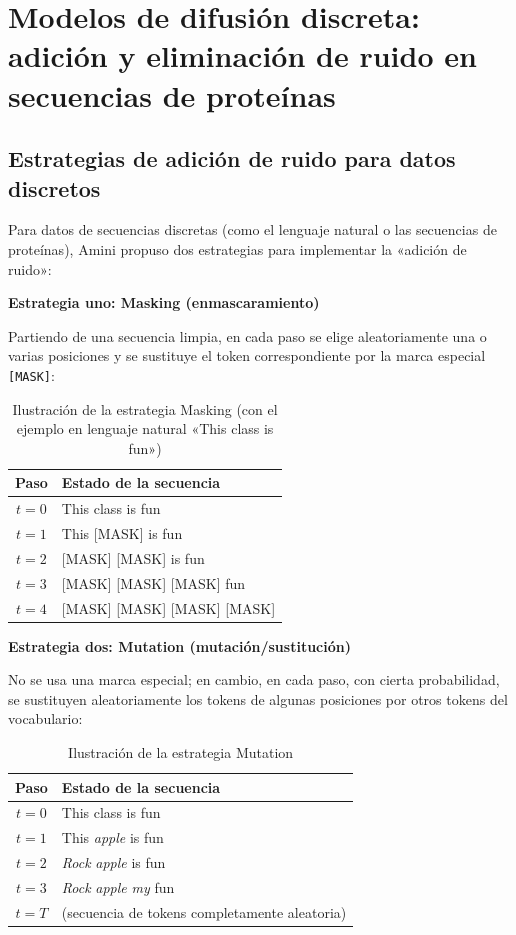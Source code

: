 \section{Modelos de difusión discreta: adición y eliminación de ruido en secuencias de proteínas}

\subsection{Estrategias de adición de ruido para datos discretos}

Para datos de secuencias discretas (como el lenguaje natural o las secuencias de proteínas), Amini propuso dos estrategias para implementar la «adición de ruido»:

\textbf{Estrategia uno: Masking (enmascaramiento)}

Partiendo de una secuencia limpia, en cada paso se elige aleatoriamente una o varias posiciones y se sustituye el token correspondiente por la marca especial \texttt{[MASK]}:

\begin{table}[H]
\centering
\caption{Ilustración de la estrategia Masking (con el ejemplo en lenguaje natural «This class is fun»)}
\begin{tabular}{@{}cl@{}}
\toprule
\textbf{Paso} & \textbf{Estado de la secuencia} \\
\midrule
$t=0$ & This class is fun \\
$t=1$ & This {[}MASK{]} is fun \\
$t=2$ & {[}MASK{]} {[}MASK{]} is fun \\
$t=3$ & {[}MASK{]} {[}MASK{]} {[}MASK{]} fun \\
$t=4$ & {[}MASK{]} {[}MASK{]} {[}MASK{]} {[}MASK{]} \\
\bottomrule
\end{tabular}
\end{table}

\textbf{Estrategia dos: Mutation (mutación/sustitución)}

No se usa una marca especial; en cambio, en cada paso, con cierta probabilidad, se sustituyen aleatoriamente los tokens de algunas posiciones por otros tokens del vocabulario:

\begin{table}[H]
\centering
\caption{Ilustración de la estrategia Mutation}
\begin{tabular}{@{}cl@{}}
\toprule
\textbf{Paso} & \textbf{Estado de la secuencia} \\
\midrule
$t=0$ & This class is fun \\
$t=1$ & This \textit{apple} is fun \\
$t=2$ & \textit{Rock} \textit{apple} is fun \\
$t=3$ & \textit{Rock} \textit{apple} \textit{my} fun \\
$t=T$ & (secuencia de tokens completamente aleatoria) \\
\bottomrule
\end{tabular}
\end{table}

